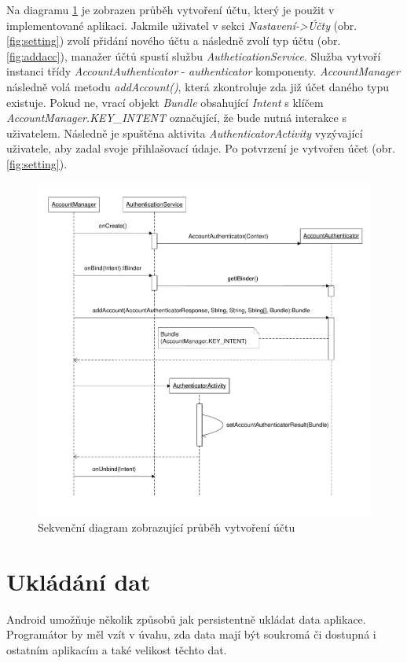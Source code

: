 \documentclass{diplomka}
\begin{document}
Na diagramu \ref{fig:andauth} je zobrazen průběh vytvoření účtu, který je použit v implementované aplikaci. Jakmile uživatel v sekci \emph{Nastavení->Účty} (obr. \ref{fig:setting}) zvolí přidání nového účtu a následně zvolí typ účtu (obr. \ref{fig:addacc}), manažer účtů spustí službu \emph{AutheticationService}. Služba vytvoří instanci třídy \emph{AccountAuthenticator} - \emph{authenticator} komponenty. \emph{AccountManager} následně volá metodu \emph{addAccount()}, která zkontroluje zda již účet daného typu existuje. Pokud ne, vrací objekt \emph{Bundle} obsahující \emph{Intent} s klíčem \emph{AccountManager.KEY\_INTENT} označující, že bude nutná interakce s uživatelem. Následně je spuštěna aktivita \emph{AuthenticatorActivity} vyzývající uživatele, aby zadal svoje přihlašovací údaje. Po potvrzení je vytvořen účet (obr. \ref{fig:setting}).
\begin{figure}[H]
  \centering
  \includegraphics[scale=0.7]{visio/andauth.pdf}
\caption{Sekvenční diagram zobrazující průběh vytvoření účtu}
\label{fig:andauth}
\end{figure}



\section{Ukládání dat}
Android umožňuje několik způsobů jak persistentně ukládat data aplikace. Programátor by měl vzít v úvahu, zda data mají být soukromá či dostupná i ostatním aplikacím a také velikost těchto dat. 
\end{document}
